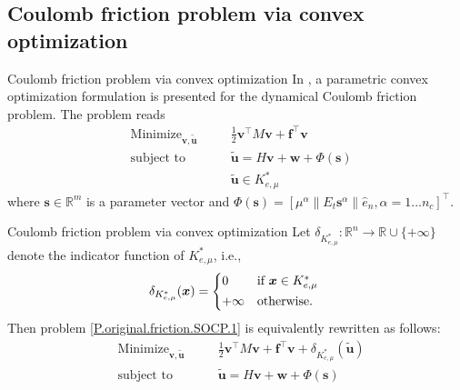 \documentclass[8pt,red]{beamer}
\theoremstyle{plain}
\theoremstyle{definition}
\theoremstyle{remark}
\newcommand{\MIN}{\mathop{\mathrm{Minimize}}}
\newcommand{\ST}{\mathop{\mathrm{subject~to}}}
\newcommand{\overRe}{\ensuremath{\Re\cup\{+\infty\}}}
\renewcommand{\Re}{\ensuremath{\mathbb{R}}}
\newcommand{\bi}[1]{\ensuremath{\boldsymbol{#1}}}
\begin{document}
\subsection{Coulomb friction problem via convex optimization}
\begin{frame}{Coulomb friction problem via convex optimization}
In \citep{acary2011formulation}, a parametric convex optimization formulation is presented for the dynamical Coulomb friction problem. The problem reads 
\begin{subequations}\label{P.original.friction.SOCP.1}%
  \begin{alignat}{3}
    & \MIN_{\bi{v}, \tilde{\bi{u}}}  &{\quad}& 
    \frac{1}{2} \bi{v}^{\top} M \bi{v} + \bi{f}^{\top} \bi{v} \\
    & \ST && 
    \tilde{\bi{u}} = H \bi{v} + \bi{w} + \Phi(\bi{s})  \\
    & && 
    \tilde{\bi{u}} \in K_{e,\mu}^{*} 
  \end{alignat}
\end{subequations}
where $\bi{s} \in \Re^{m}$ is a parameter vector and $\Phi(\bi{s}) = [\mu^{\alpha} \| E_{t} \bi{s}^{\alpha} \| \hat{e}_{n}, \alpha = 1...n_{c}]^{\top}$. 
\end{frame}

\begin{frame}{Coulomb friction problem via convex optimization}
Let $\delta_{K_{e,\mu}^{*}} : \Re^{n} \to \overRe$ denote the 
indicator function of $K_{e,\mu}^{*}$, i.e., 
\begin{align}
  \delta_{K_{e,\mu}^{*}}(\bi{x}) = 
  \begin{dcases*}
    0 
    & if $\bi{x} \in K_{e,\mu}^{*}$ \\
    +\infty
    & otherwise. 
  \end{dcases*}
\end{align}
Then problem \eqref{P.original.friction.SOCP.1} is equivalently rewritten as follows:
 \begin{subequations}\label{P.quadratic.SOCP.2}%
   \begin{alignat}{3}
     & \MIN_{\bi{v}, \tilde{\bi{u}}}  &{\quad}& 
    \frac{1}{2} \bi{v}^{\top} M \bi{v} + \bi{f}^{\top} \bi{v} + \delta_{K_{e,\mu}^{*}}(\tilde{\bi{u}}) \\
     & \ST & & 
     \tilde{\bi{u}} = H \bi{v} + \bi{w} + \Phi(\bi{s})   
   \end{alignat}
 \end{subequations}  
\end{frame}
\end{document}
